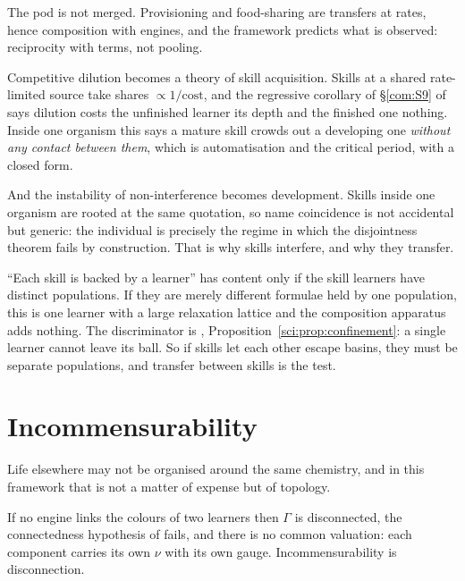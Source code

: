 The pod is not merged. Provisioning and food-sharing are transfers at
rates, hence composition with engines, and the framework predicts what is
observed: reciprocity with terms, not pooling.

Competitive dilution becomes a theory of skill acquisition. Skills at a
shared rate-limited source take shares $\propto 1/\text{cost}$, and the
regressive corollary of \S\ref{com:S9} of \chComp says dilution costs the
unfinished learner its depth and the finished one nothing. Inside one
organism this says a mature skill crowds out a developing one \emph{without
any contact between them}, which is automatisation and the critical period,
with a closed form.

And the instability of non-interference becomes development. Skills inside
one organism are rooted at the same quotation, so name coincidence is not
accidental but generic: the individual is precisely the regime in which the
disjointness theorem fails by construction. That is why skills interfere,
and why they transfer.

\begin{remark}\label{eng:orca-claim-empirical-definitional}
``Each skill is backed by a learner'' has content only if the skill
learners have distinct populations. If they are merely different formulae
held by one population, this is one learner with a large relaxation lattice
and the composition apparatus adds nothing. The discriminator is
\chSci, Proposition~\ref{sci:prop:confinement}: a single learner cannot leave its ball. So if
skills let each other escape basins, they must be separate populations, and
transfer between skills is the test.
\end{remark}

\section{Incommensurability}\label{eng:S10}
\label{eng:sec:incomm}

Life elsewhere may not be organised around the same chemistry, and in this
framework that is not a matter of expense but of topology.

\begin{proposition}\label{eng:no-engine-no-numeraire}
If no engine links the colours of two learners then $\Gamma$ is
disconnected, the connectedness hypothesis of \cite[Thm.~3.3]{vtok} fails,
and there is no common valuation: each component carries its own $\nu$ with
its own gauge. Incommensurability is disconnection.
\end{proposition}

